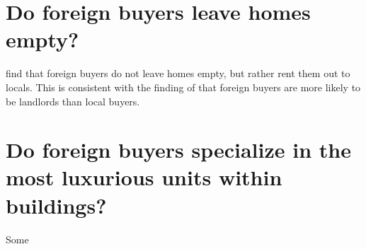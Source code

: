 \documentclass[12pt]{article}
\begin{document}
\section{Do foreign buyers leave homes empty?}

\textcite{favilukisVanNieuwerburgh} find that foreign buyers do not leave homes empty, but rather rent them out to locals. This is consistent with the finding of \textcite{baker} that foreign buyers are more likely to be landlords than local buyers.

\section{Do foreign buyers specialize in the most luxurious units within buildings?}

Some 
\end{document}
